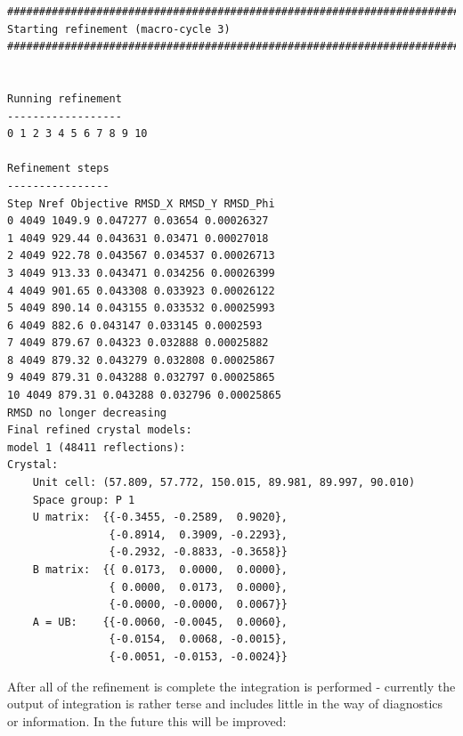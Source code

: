 \documentclass[a4paper, 11pt]{article}
\begin{document}
{\small
\begin{verbatim}
################################################################################
Starting refinement (macro-cycle 3)
################################################################################


Running refinement
------------------
0 1 2 3 4 5 6 7 8 9 10

Refinement steps
----------------
Step Nref Objective RMSD_X RMSD_Y RMSD_Phi
0 4049 1049.9 0.047277 0.03654 0.00026327 
1 4049 929.44 0.043631 0.03471 0.00027018 
2 4049 922.78 0.043567 0.034537 0.00026713 
3 4049 913.33 0.043471 0.034256 0.00026399 
4 4049 901.65 0.043308 0.033923 0.00026122 
5 4049 890.14 0.043155 0.033532 0.00025993 
6 4049 882.6 0.043147 0.033145 0.0002593 
7 4049 879.67 0.04323 0.032888 0.00025882 
8 4049 879.32 0.043279 0.032808 0.00025867 
9 4049 879.31 0.043288 0.032797 0.00025865 
10 4049 879.31 0.043288 0.032796 0.00025865 
RMSD no longer decreasing
Final refined crystal models:
model 1 (48411 reflections):
Crystal:
    Unit cell: (57.809, 57.772, 150.015, 89.981, 89.997, 90.010)
    Space group: P 1
    U matrix:  {{-0.3455, -0.2589,  0.9020},
                {-0.8914,  0.3909, -0.2293},
                {-0.2932, -0.8833, -0.3658}}
    B matrix:  {{ 0.0173,  0.0000,  0.0000},
                { 0.0000,  0.0173,  0.0000},
                {-0.0000, -0.0000,  0.0067}}
    A = UB:    {{-0.0060, -0.0045,  0.0060},
                {-0.0154,  0.0068, -0.0015},
                {-0.0051, -0.0153, -0.0024}}
\end{verbatim}
}

\noindent
After all of the refinement is complete the integration is performed -
currently the output of integration is rather terse and includes little
in the way of diagnostics or information. In the future this will be improved:
\end{document}
